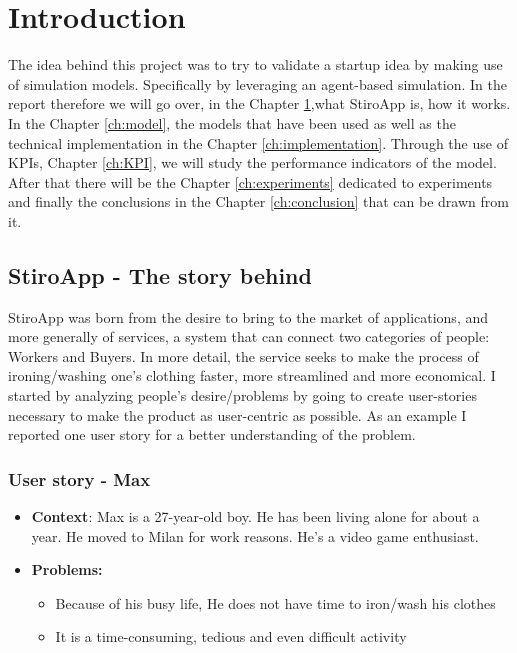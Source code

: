 \chapter{Introduction}\label{ch:introduction}
The idea behind this project was to try to validate a startup idea by making use of simulation models. Specifically by leveraging an agent-based simulation.
In the report therefore we will go over, in the Chapter \ref{ch:introduction},what StiroApp is, how it works. In the Chapter \ref{ch:model}, the models that have been used as well as the technical implementation in the Chapter \ref{ch:implementation}. Through the use of KPIs, Chapter \ref{ch:KPI}, we will study the performance indicators of the model. After that there will be the Chapter \ref{ch:experiments} dedicated to experiments and finally the conclusions in the Chapter \ref{ch:conclusion} that can be drawn from it.

\section{StiroApp - The story behind}
StiroApp was born from the desire to bring to the market of applications, and more generally of services, a system that can connect two categories of people: Workers and Buyers. In more detail, the service seeks to make the process of ironing/washing one's clothing faster, more streamlined and more economical. I started by analyzing people's desire/problems by going to create user-stories necessary to make the product as user-centric as possible. As an example I reported one user story for a better understanding of the problem.
\subsection{User story - Max}
\begin{itemize}
\item \textbf{Context}: Max is a 27-year-old boy. He has been living alone for about a year. He moved to Milan for work reasons. He's a video game enthusiast.
\item \textbf{Problems:} 
	\begin{itemize}
		\item Because of his busy life, He does not have time to iron/wash his clothes
		\item It is a time-consuming, tedious and even difficult activity
	\end{itemize}
\end{itemize}
